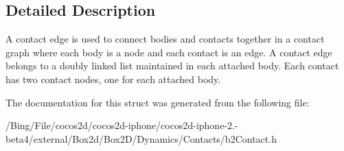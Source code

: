 \subsection{Detailed Description}
A contact edge is used to connect bodies and contacts together in a contact graph where each body is a node and each contact is an edge. A contact edge belongs to a doubly linked list maintained in each attached body. Each contact has two contact nodes, one for each attached body. 

The documentation for this struct was generated from the following file\-:\begin{DoxyCompactItemize}
\item 
/\-Bing/\-File/cocos2d/cocos2d-\/iphone/cocos2d-\/iphone-\/2.-\/beta4/external/\-Box2d/\-Box2\-D/\-Dynamics/\-Contacts/b2\-Contact.\-h\end{DoxyCompactItemize}
